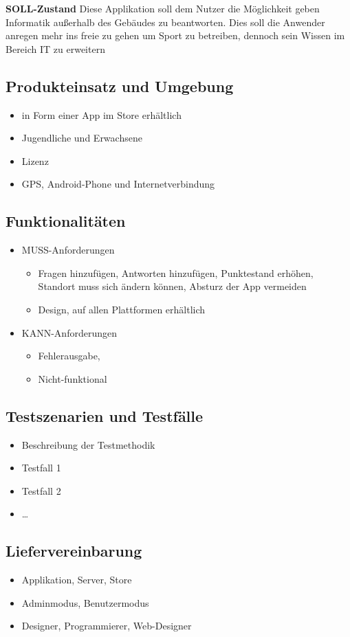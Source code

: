 \textbf {SOLL-Zustand}
Diese Applikation soll dem Nutzer die Möglichkeit geben Informatik außerhalb des Gebäudes zu beantworten. Dies soll die Anwender anregen mehr ins freie zu gehen um Sport zu betreiben, dennoch sein Wissen im Bereich IT zu erweitern


\subsection{Produkteinsatz und Umgebung}
\begin{itemize}
	\item in Form einer App im Store erhältlich
	\item Jugendliche und Erwachsene
	\item Lizenz
	\item GPS, Android-Phone und Internetverbindung
\end{itemize}
\subsection{Funktionalitäten}
\begin{itemize}
	\item MUSS-Anforderungen
	\begin{itemize}
		\item Fragen hinzufügen, Antworten hinzufügen, Punktestand erhöhen, Standort muss sich ändern können, Absturz der App vermeiden
		\item Design, auf allen Plattformen erhältlich
	\end{itemize}
	\item KANN-Anforderungen
	\begin{itemize}
		\item Fehlerausgabe, 
		\item Nicht-funktional
	\end{itemize}
\end{itemize}
\subsection{Testszenarien und Testfälle}
\begin{itemize}
	\item Beschreibung der Testmethodik
	\item Testfall 1
	\item Testfall 2
	\item \ldots
\end{itemize}
\subsection{Liefervereinbarung}
\begin{itemize}
	\item Applikation, Server, Store
	\item Adminmodus, Benutzermodus
	\item Designer, Programmierer, Web-Designer
\end{itemize}
